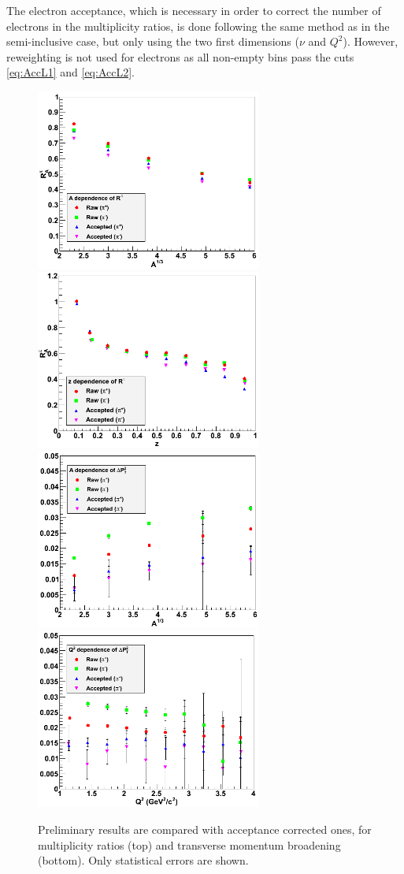 The electron acceptance, which is necessary in order to correct the number of electrons 
in the multiplicity ratios, is done following the same method as in the 
semi-inclusive case, but only using the two first dimensions ($\nu$ 
and $Q^2$). However, reweighting is not used 
for electrons as all non-empty bins pass the cuts \ref{eq:AccL1} and 
\ref{eq:AccL2}.

\begin{figure}[tbp]
\centering
\includegraphics[width=7.4cm] {chap5-fig/b_RvA.png} 
\includegraphics[width=7.4cm] {chap5-fig/b_RvZ.png} 
\includegraphics[width=7.4cm] {chap5-fig/b_PvA.png} 
\includegraphics[width=7.4cm] {chap5-fig/b_PvQ2.png} 
\caption {Preliminary results are compared with acceptance corrected ones, 
for multiplicity ratios (top) and transverse momentum broadening 
(bottom). Only statistical errors are shown.}
\label{fig:AcceptPlots}
\end{figure}

